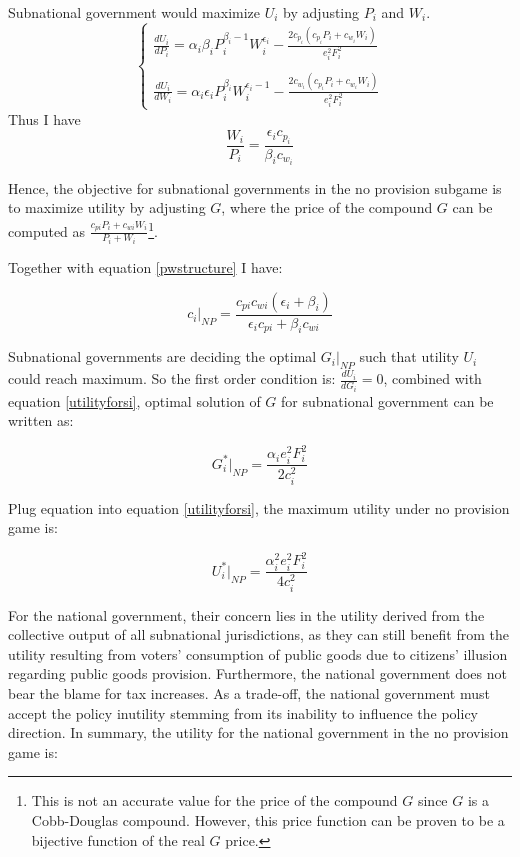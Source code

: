 \documentclass[man]{apa7}
\begin{document}
Subnational government would maximize $U_i$ by adjusting $P_i$ and $W_i$.
$$
  \left\{\begin{array}{l}
    \frac{dU_i}{dP_i}= \alpha_i \beta_i P_i^{\beta_i-1}W_i^{\epsilon_i}-\frac{2 c_{p_i}(c_{p_i}P_i+c_{w_i}W_i)}{e_i^2 F_i^2} \\ \\

    \frac{dU_i}{dW_i}=  \alpha_i \epsilon_i P_i^{\beta_i}W_i^{\epsilon_i-1}-\frac{2 c_{w_i}(c_{p_i}P_i+c_{w_i}W_i)}{e_i^2 F_i^2}\end{array}\right.
$$
Thus I have
\begin{equation}
  \frac{W_i}{P_i}=\frac{\epsilon_i c_{p_i}}{\beta_ic_{w_i}}\label{pwstructure}
\end{equation}

Hence, the objective for subnational governments in the no provision subgame is to maximize utility by adjusting $G$, where the price of the compound $G$ can be computed as $\frac{c_{pi}P_i+c_{wi}W_i}{P_i+W_i}$\footnote{This is not an accurate value for the price of the compound $G$ since $G$ is a Cobb-Douglas compound. However, this price function can be proven to be a bijective function of the real $G$ price.}.

Together with equation \ref{pwstructure} I have:

\begin{equation}
  c_i|_{NP}=\frac{c_{pi}c_{wi}(\epsilon_i+\beta_i)}{\epsilon_ic_{pi}+\beta_i c_{wi}}
\end{equation}

Subnational governments are deciding the optimal $G_i|_{NP}$ such that utility $U_i$ could reach maximum. So the first order condition is:
$\frac{dU_i}{dG_i}=0$, combined with equation \ref{utilityforsi}, optimal solution of $G$ for subnational government can be written as:

\begin{equation}
  G_i^*|_{NP}=\frac{\alpha_i e_i^2 F_i^2}{2 c_i^2} \label{gi}
\end{equation}

Plug equation \label{gi} into equation \ref{utilityforsi}, the maximum utility under no provision game is:

\begin{equation}
  U_i^*|_{NP}=\frac{\alpha_i^2 e_i^2 F_i^2}{4c_i^2} \label{uforsiinnp}
\end{equation}

For the national government, their concern lies in the utility derived from the collective output of all subnational jurisdictions, as they can still benefit from the utility resulting from voters' consumption of public goods due to citizens' illusion regarding public goods provision. Furthermore, the national government does not bear the blame for tax increases. As a trade-off, the national government must accept the policy inutility stemming from its inability to influence the policy direction. In summary, the utility for the national government in the no provision game is: %
\end{document}
